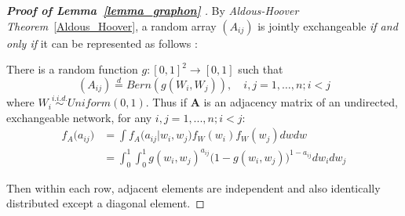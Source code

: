 \documentclass[12pt]{article}
\theoremstyle{definition}
\begin{document}
\begin{proof}[\textbf{Proof of Lemma~\ref{lemma_graphon} }] 
	By \textit{Aldous-Hoover Theorem}~\ref{Aldous_Hoover}, a random array $(A_{ij})$ is jointly exchangeable \textit{if and only if} it can be represented as follows : 
		
	There is a random function $g : [0,1]^2 \rightarrow [0,1]$ such that 
\begin{equation}
(A_{ij})  \stackrel{d}{=} Bern( g(W_{i}, W_{j})), \quad i,j=1,\ldots,n; i < j
\end{equation}
where $W_{i} \overset{i.i.d.}{\sim} Uniform(0,1)$. Thus if $\mathbf{A}$ is an adjacency matrix of an undirected, exchangeable network, for any $i,j = 1,... , n; i < j$:
\begin{equation}
\begin{split}
	f_{A} \big(  a_{ij} \big) & = \int f_{A} \big( a_{ij} \big| w_{i}, w_{j} \big) f_{W}(w_{i}) f_{W}(w_{j}) dw dw \\ & = \int_{0}^{1} \int_{0}^{1} g( w_{i},  w_{j})^{a_{ij}} \big( 1- g( w_{i},  w_{j}) \big)^{1-a_{ij}} dw_{i} dw_{j} 
\end{split}
\end{equation}
		
Then within each row, adjacent elements are independent and also identically distributed except a diagonal element.

\end{proof}
		
\end{document}
